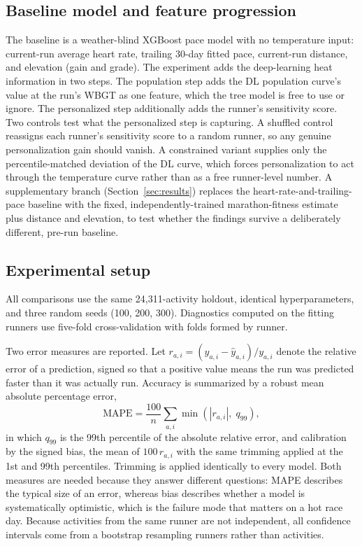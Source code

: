 \documentclass[11pt]{article}
\renewcommand{\_}{\textunderscore\allowbreak}
\begin{document}
\subsection{Baseline model and feature progression}

The baseline is a weather-blind XGBoost pace model with no temperature input: current-run average heart rate, trailing 30-day fitted pace, current-run distance, and elevation (gain and grade). The experiment adds the deep-learning heat information in two steps. The population step adds the DL population curve's value at the run's WBGT as one feature, which the tree model is free to use or ignore. The personalized step additionally adds the runner's sensitivity score. Two controls test what the personalized step is capturing. A shuffled control reassigns each runner's sensitivity score to a random runner, so any genuine personalization gain should vanish. A constrained variant supplies only the percentile-matched deviation of the DL curve, which forces personalization to act through the temperature curve rather than as a free runner-level number. A supplementary branch (Section~\ref{sec:results}) replaces the heart-rate-and-trailing-pace baseline with the fixed, independently-trained marathon-fitness estimate plus distance and elevation, to test whether the findings survive a deliberately different, pre-run baseline.

\subsection{Experimental setup}

All comparisons use the same 24{,}311-activity holdout, identical hyperparameters, and three random seeds (100, 200, 300). Diagnostics computed on the fitting runners use five-fold cross-validation with folds formed by runner.

Two error measures are reported. Let $r_{a,i} = (y_{a,i} - \hat{y}_{a,i})/y_{a,i}$ denote the relative error of a prediction, signed so that a positive value means the run was predicted faster than it was actually run. Accuracy is summarized by a robust mean absolute percentage error,
\begin{equation}
  \mathrm{MAPE} = \frac{100}{n}\sum_{a,i} \min\!\left(|r_{a,i}|,\; q_{99}\right),
\end{equation}
in which $q_{99}$ is the 99th percentile of the absolute relative error, and calibration by the signed bias, the mean of $100\,r_{a,i}$ with the same trimming applied at the 1st and 99th percentiles. Trimming is applied identically to every model. Both measures are needed because they answer different questions: MAPE describes the typical size of an error, whereas bias describes whether a model is systematically optimistic, which is the failure mode that matters on a hot race day. Because activities from the same runner are not independent, all confidence intervals come from a bootstrap resampling runners rather than activities.
\end{document}

